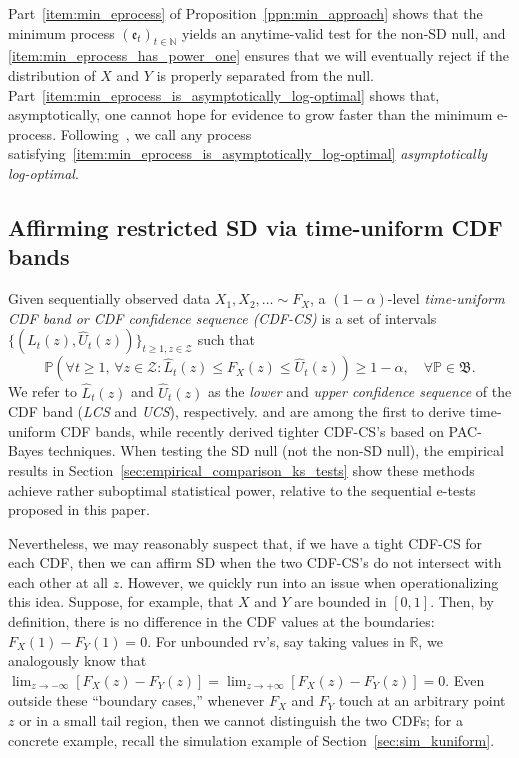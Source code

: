 \documentclass[12pt,twoside]{article}
\theoremstyle{plain}
\theoremstyle{definition}
\theoremstyle{remark}
\newcommand{\N}{\mathbb{N}}
\newcommand{\R}{\mathbb{R}}
\newcommand{\calZ}{\mathcal{Z}}
\newcommand{\Psymb}{\mathbb{P}}
\newcommand{\prob}[1]{\Psymb\left({#1}\right)}
\newcommand{\frakB}{\mathfrak{B}}
\newcommand{\e}{\mathfrak{e}}
\begin{document}
Part~\ref{item:min_eprocess} of Proposition~\ref{ppn:min_approach} shows that the minimum process $(\e_t)_{t\in \N}$ yields an anytime-valid test for the non-SD null, and \ref{item:min_eprocess_has_power_one} ensures that we will eventually reject if the distribution of $X$ and $Y$ is properly separated from the null. 
Part~\ref{item:min_eprocess_is_asymptotically_log-optimal} shows that, asymptotically, one cannot hope for evidence to grow faster than the minimum e-process. 
Following~\citet{waudbysmith2025universal}, we call any process satisfying~\ref{item:min_eprocess_is_asymptotically_log-optimal} \emph{asymptotically log-optimal}.

\subsection{Affirming restricted SD via time-uniform CDF bands}\label{sec:testing_nonsd_tvCS}

Given sequentially observed data $X_1, X_2, \ldots \sim F_X$, a $(1-\alpha)$-level \emph{time-uniform CDF band \emph{or} CDF confidence sequence (CDF-CS)} is a set of intervals $\{(\hat{L}_t(z), \hat{U}_t(z))\}_{t \geq 1, z \in \calZ}$ such that
\begin{equation*}\label{eqn:tvCS}
    \prob{\forall t \geq 1, \, \forall z \in \calZ: \hat{L}_t(z) \leq F_X(z) \leq \hat{U}_t(z) } \geq 1-\alpha, \quad \forall \Psymb\in \frakB.
\end{equation*}
We refer to $\hat{L}_t(z)$ and $\hat{U}_t(z)$ as the \emph{lower} and \emph{upper confidence sequence} of the CDF band (\emph{LCS} and \emph{UCS}), respectively.
\citet{howard2022sequential} and \citet{mineiro2023nonstationarity} are among the first to derive time-uniform CDF bands, while \citet{clerico2026uniform} recently derived tighter CDF-CS's based on PAC-Bayes techniques. 
When testing the SD null (not the non-SD null), the empirical results in Section~\ref{sec:empirical_comparison_ks_tests} show these methods achieve rather suboptimal statistical power, relative to the sequential e-tests proposed in this paper. 

Nevertheless, we may reasonably suspect that, if we have a tight CDF-CS for each CDF, then we can affirm SD when the two CDF-CS's do not intersect with each other at all $z$. 
However, we quickly run into an issue when operationalizing this idea. 
Suppose, for example, that $X$ and $Y$ are bounded in $[0, 1]$. 
Then, by definition, there is no difference in the CDF values at the boundaries: $F_X(1) - F_Y(1) = 0$. 
For unbounded rv's, say taking values in $\R$, we analogously know that $\lim_{z \to -\infty}[F_X(z) - F_Y(z)] = \lim_{z \to +\infty}[F_X(z) - F_Y(z)] = 0$. 
Even outside these ``boundary cases,'' whenever $F_X$ and $F_Y$ touch at an arbitrary point $z$ or in a small tail region, then we cannot distinguish the two CDFs; for a concrete example, recall the simulation example of Section~\ref{sec:sim_kuniform}. 
\end{document}
